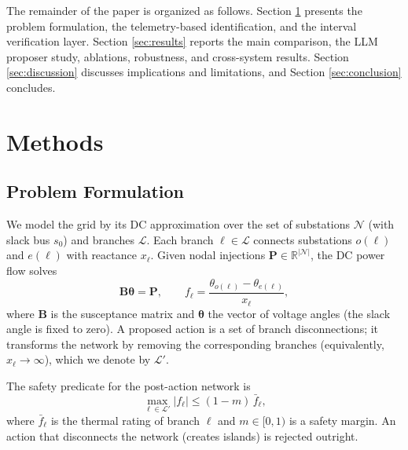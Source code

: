 \documentclass[11pt,a4paper]{article}
\begin{document}
The remainder of the paper is organized as follows. Section \ref{sec:methods}
presents the problem formulation, the telemetry-based identification, and the
interval verification layer. Section \ref{sec:results} reports the main
comparison, the LLM proposer study, ablations, robustness, and cross-system
results. Section \ref{sec:discussion} discusses implications and limitations,
and Section \ref{sec:conclusion} concludes.

\section{Methods}
\label{sec:methods}

\subsection{Problem Formulation}
\label{sec:problem}

We model the grid by its DC approximation over the set of substations
$\mathcal{N}$ (with slack bus $s_0$) and branches $\mathcal{L}$. Each branch
$\ell \in \mathcal{L}$ connects substations $o(\ell)$ and $e(\ell)$ with
reactance $x_\ell$. Given nodal injections $\mathbf{P} \in \mathbb{R}^{|\mathcal{N}|}$,
the DC power flow solves
\begin{equation}
\mathbf{B}\boldsymbol{\theta} = \mathbf{P},\qquad
f_\ell = \frac{\theta_{o(\ell)} - \theta_{e(\ell)}}{x_\ell},
\label{eq:dc}
\end{equation}
where $\mathbf{B}$ is the susceptance matrix and $\boldsymbol{\theta}$ the vector
of voltage angles (the slack angle is fixed to zero). A proposed action is a set
of branch disconnections; it transforms the network by removing the corresponding
branches (equivalently, $x_\ell \to \infty$), which we denote by $\mathcal{L}'$.

The safety predicate for the post-action network is
\begin{equation}
\max_{\ell \in \mathcal{L}'} |f_\ell| \le (1 - m) \, \bar f_\ell,
\label{eq:safety}
\end{equation}
where $\bar f_\ell$ is the thermal rating of branch $\ell$ and $m \in [0,1)$ is a
safety margin. An action that disconnects the network (creates islands) is
rejected outright.
\end{document}
